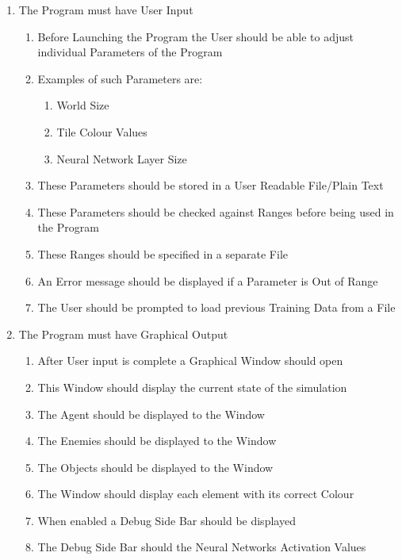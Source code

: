 \begin{flushleft}
            \begin{enumerate}
                \item The Program must have User Input
                \begin{enumerate}
                    \item Before Launching the Program the User should be able to adjust individual Parameters of the Program
                    \item Examples of such Parameters are:
                    \begin{enumerate}
                        \item World Size
                        \item Tile Colour Values
                        \item Neural Network Layer Size
                    \end{enumerate}
                    \item These Parameters should be stored in a User Readable File/Plain Text
                    \item These Parameters should be checked against Ranges before being used in the Program
                    \item These Ranges should be specified in a separate File
                    \item An Error message should be displayed if a Parameter is Out of Range
                    \item The User should be prompted to load previous Training Data from a File
                \end{enumerate}

                \item The Program must have Graphical Output
                \begin{enumerate}
                    \item After User input is complete a Graphical Window should open
                    \item This Window should display the current state of the simulation
                    \item The Agent should be displayed to the Window
                    \item The Enemies should be displayed to the Window
                    \item The Objects should be displayed to the Window
                    \item The Window should display each element with its correct Colour
                    \item When enabled a Debug Side Bar should be displayed
                    \item The Debug Side Bar should the Neural Networks Activation Values
                \end{enumerate}


\end{enumerate}
\end{flushleft}
